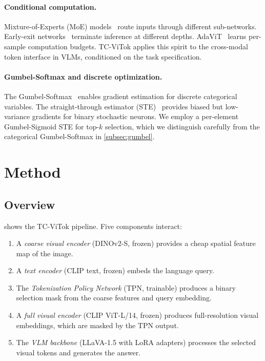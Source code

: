 \documentclass[11pt,a4paper]{article}
\begin{document}
\paragraph{Conditional computation.}
Mixture-of-Experts (MoE) models~\citep{shazeer2017moe} route inputs through
different sub-networks. Early-exit networks~\citep{teerapittayanon2016branchynet}
terminate inference at different depths. AdaViT~\citep{meng2022adavit} learns
per-sample computation budgets. TC-ViTok applies this spirit to the cross-modal
token interface in VLMs, conditioned on the task specification.

\paragraph{Gumbel-Softmax and discrete optimization.}
The Gumbel-Softmax~\citep{jang2017categorical,maddison2017concrete} enables
gradient estimation for discrete categorical variables. The straight-through
estimator (STE)~\citep{bengio2013estimating} provides biased but low-variance
gradients for binary stochastic neurons. We employ a per-element Gumbel-Sigmoid
STE for top-$k$ selection, which we distinguish carefully from the categorical
Gumbel-Softmax in \cref{subsec:gumbel}.

\section{Method}
\label{sec:method}

\subsection{Overview}
\label{subsec:overview}

 shows the TC-ViTok pipeline. Five components interact:
\begin{enumerate}[leftmargin=2em, itemsep=1pt]
  \item A \emph{coarse visual encoder} (DINOv2-S, frozen) provides a cheap
    spatial feature map of the image.
  \item A \emph{text encoder} (CLIP text, frozen) embeds the language query.
  \item The \emph{Tokenization Policy Network} (TPN, trainable) produces a
    binary selection mask from the coarse features and query embedding.
  \item A \emph{full visual encoder} (CLIP ViT-L/14, frozen) produces
    full-resolution visual embeddings, which are masked by the TPN output.
  \item The \emph{VLM backbone} (LLaVA-1.5 with LoRA adapters) processes the
    selected visual tokens and generates the answer.
\end{enumerate}
\end{document}
